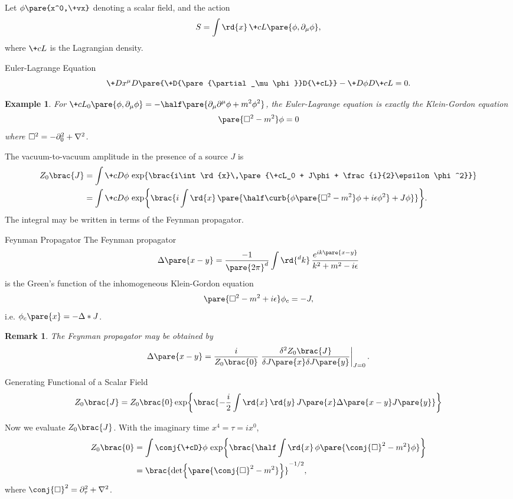 \documentclass[hidelinks]{article}
\newtheorem{example}{Example}
\newtheorem{remark}{Remark}
\begin{document}
Let $\phi\pare{x^0,\+vx}$ denoting a scalar field, and the action
\[ S = \int \rd{x}\, \+cL\pare{\phi,\partial_\mu \phi}, \]
where $\+cL$ is the Lagrangian density.
\begin{finaleq}{Euler-Lagrange Equation}
    \[ \+D{x^\mu}D{}\pare{\+D{\pare{\partial_\mu \phi}}D{\+cL}} - \+D\phi D{\+cL} = 0. \]
\end{finaleq}
\begin{sample}
    \begin{example}
        For $\displaystyle \+cL_0\pare{\phi,\partial_\mu \phi} = -\half\pare{\partial_\mu \partial^\mu \phi + m^2\phi^2}$, the Euler-Lagrange equation is exactly the Klein-Gordon equation
        \[ \pare{\Box^2 - m^2}\phi = 0 \]
        where $\Box^2 = -\partial_0^2 + \laplacian$.
    \end{example}
\end{sample}
The vacuum-to-vacuum amplitude in the presence of a source $J$ is
\begin{align*}
    Z_0\brac{J} &= \int \+cD\phi\,\exp\brac{i\int \rd{x}\,\pare{\+cL_0 + J\phi + \frac{i}{2}\epsilon \phi^2}} \\
    &= \int \+cD\phi\,\exp\brac{i\int \rd{x}\, \pare{\half \curb{\phi\pare{\Box^2 - m^2}\phi + i\epsilon \phi^2} + J\phi}}.
\end{align*}
The integral may be written in terms of the Feynman propagator.
\begin{finaleq}{Feynman Propagator}
    The Feynman propagator
    \[ \Delta\pare{x-y} = \frac{-1}{\pare{2\pi}^d}\int \rd{^d k}\, \frac{e^{ik\pare{x-y}}}{k^2 + m^2 - i\epsilon} \]
    is the Green's function of the inhomogeneous Klein-Gordon equation
    \[ \pare{\Box^2 - m^2 + i\epsilon}\phi_c = -J, \]
    i.e. $\phi_c\pare{x} = -\Delta * J$.
\end{finaleq}
\begin{remark}
    The Feynman propagator may be obtained by
    \[ \Delta\pare{x-y} = \frac{i}{Z_0\brac{0}}\left. \frac{\delta^2 Z_0\brac{J}}{\delta J\pare{x}\delta J\pare{y}} \right\vert_{J=0}. \]
\end{remark}
\begin{finaleq}{Generating Functional of a Scalar Field}
    \[ Z_0\brac{J} = Z_0\brac{0} \exp\brac{-\frac{i}{2}\int \rd{x}\,\rd{y}\, J\pare{x}\Delta\pare{x-y}J\pare{y}} \]
\end{finaleq}
Now we evaluate $Z_0\brac{J}$. With the imaginary time $x^4 = \tau = ix^0$,
\begin{align*}
    Z_0\brac{0} &= \int \conj{\+cD}\phi\,\exp\brac{\half \int \rd{x}\,\phi\pare{\conj{\Box}^2 - m^2}\phi} \\
    &= \brac{\det\pare{\conj{\Box}^2 - m^2}}^{-1/2},
\end{align*}
where $\conj{\Box}^2 = \partial_\tau^2 + \laplacian$.
\end{document}

